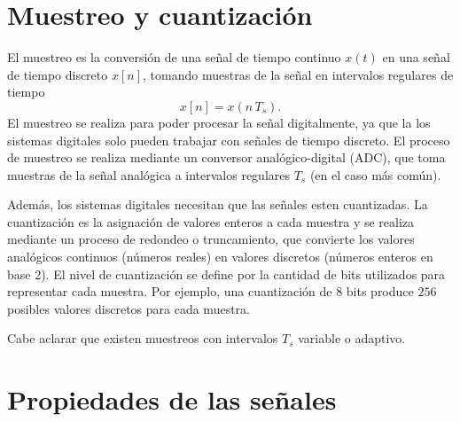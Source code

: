 %
%
%

\section{Muestreo y cuantización}

El muestreo es la conversión de una señal de tiempo continuo $x(t)$ en una señal de tiempo discreto $x[n]$, tomando muestras de la señal en intervalos regulares de tiempo
\begin{equation}
	x[n] = x(n \, T_{s}).
\end{equation}
El muestreo se realiza para poder procesar la señal digitalmente, ya que la los sistemas digitales solo pueden trabajar con señales de tiempo discreto. El proceso de muestreo se realiza mediante un conversor analógico-digital (ADC), que toma muestras de la señal analógica a intervalos regulares $T_{s}$ (en el caso más común).

Además, los sistemas digitales necesitan que las señales esten cuantizadas.
La cuantización es la asignación de valores enteros a cada muestra y se realiza mediante un proceso de redondeo o truncamiento, que convierte los valores analógicos continuos (números reales) en valores discretos (números enteros en base 2). El nivel de cuantización se define por la cantidad de bits utilizados para representar cada muestra. Por ejemplo, una cuantización de $8$ bits produce $256$ posibles valores discretos para cada muestra.

Cabe aclarar que existen muestreos con intervalos $T_{s}$ variable o adaptivo.

\section{Propiedades de las se\~{n}ales}

